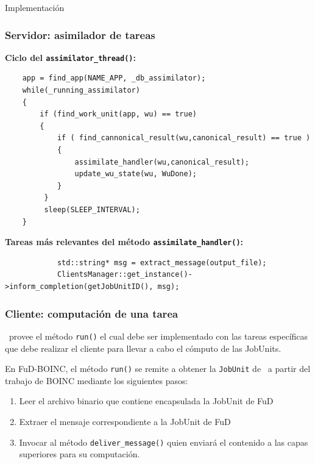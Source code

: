 \begin{subsection}{Implementación}
	\begin{frame}[fragile]\frametitle{Servidor: asimilador de tareas}
		\textbf{Ciclo del \texttt{assimilator\_thread()}:}
		\begin{lstlisting}
	app = find_app(NAME_APP, _db_assimilator);
	while(_running_assimilator)
	{
	    if (find_work_unit(app, wu) == true)
	    {
	        if ( find_cannonical_result(wu,canonical_result) == true )
	        {
	            assimilate_handler(wu,canonical_result);
	            update_wu_state(wu, WuDone);
	        }
	     }
	     sleep(SLEEP_INTERVAL);
	}
		\end{lstlisting}
		\textbf{Tareas más relevantes del método \texttt{assimilate\_handler()}:}
		\begin{lstlisting}
			std::string* msg = extract_message(output_file);
			ClientsManager::get_instance()->inform_completion(getJobUnitID(), msg);
		\end{lstlisting}
	\end{frame}

	\begin{frame}\frametitle{Cliente: computación de una tarea}
		\begin{block}{}
			\fud \ provee el método \texttt{run()} el cual debe ser implementado con las tareas específicas que debe 
			realizar el cliente para llevar a cabo el cómputo de las JobUnits.
		\end{block}
		\pause
		\vspace{4mm}
		En FuD-BOINC, el método \texttt{run()} se remite a obtener la \texttt{JobUnit} de \fud \ a partir del trabajo 
		de BOINC mediante los siguientes pasos:
		\vspace{4mm}
		\begin{enumerate}\addtolength{\itemsep}{2mm}
		    \item Leer el archivo binario que contiene encapsulada la JobUnit de FuD
		    \item Extraer el mensaje correspondiente a la JobUnit de FuD
		    \item Invocar al método \texttt{deliver\_message()} quien enviará el contenido a las capas superiores para su computación.
		\end{enumerate}
	\end{frame}


\end{subsection}
